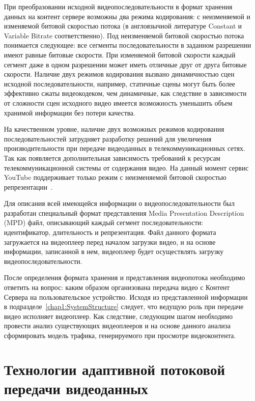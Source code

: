 При преобразовании исходной видеопоследовательности в формат хранения данных на контент сервере возможны два режима кодирования: с неизменяемой и изменяемой битовой скоростью потока (в англоязычной литературе Constant и Variable Bitrate соответственно). Под неизменяемой битовой скоростью потока понимается следующее: все сегменты последовательности в заданном разрешении имеют равные битовые скорости. При изменяемой битовой скорости каждый сегмент даже в одном разрешении может иметь отличные друг от друга битовые скорости. Наличие двух режимов кодирования вызвано динамичностью сцен исходной последовательности, например, статичные сцены могут быть более эффективно сжаты видеокодеком, чем динамичные, как следствие в зависимости от сложности сцен исходного видео имеется возможность уменьшить объем хранимой информации без потери качества.

На качественном уровне, наличие двух возможных режимов кодирования последовательностей затрудняет разработку решений для увеличения производительности при передаче видеоданных в телекоммуникационных сетях. Так как появляется дополнительная зависимость требований к ресурсам телекоммуникационной системы от содержания видео. На данный момент сервис YouTube поддерживает только режим с неизменяемой битовой скоростью репрезентации~\cite{YouTubeBR}.

Для описания всей имеющейся информации о видеопоследовательности был разработан специальный формат представления Media Presentation Description (MPD) файл, описывающий каждый сегмент последовательности: идентификатор, длительность и репрезентация. Файл данного формата загружается на видеоплеер перед началом загрузки видео, и на основе информации, записанной в нем, видеоплеер будет осуществлять загрузку видеопоследовательности.

После определения формата хранения и представления видеопотока необходимо ответить на вопрос: каким образом организована передача видео с Контент Сервера на пользовательское устройство. Исходя из представленной информации в подразделе~\ref{chap1:SystemStructure} следует, что ведущую роль при передаче видео исполняет видеоплеер. Как следствие, следующим шагом необходимо провести анализ существующих видеоплееров и на основе данного анализа сформировать модель трафика, генерируемого при просмотре видеоконтента.

\section{Технологии адаптивной потоковой передачи видеоданных}
\label{chap1:VideoPlayers}

